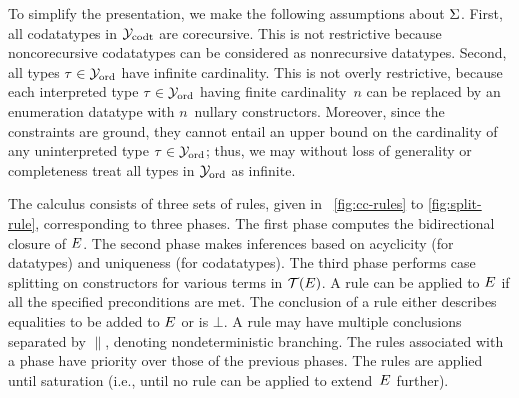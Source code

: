 To simplify the presentation, we make the following assumptions about $\mathrm{\Sigma}$.
First, all codatatypes in $\mathcal{Y}_{\mathrm{codt}}$ are corecursive. This is not restrictive
because noncorecursive codatatypes can be considered as nonrecursive
datatypes.
Second, all types $\tau \in \mathcal{Y}_{\mathrm{ord}}$ have infinite cardinality.
This is not overly restrictive, because each interpreted type $\tau \in \mathcal{Y}_{\mathrm{ord}}$
having finite cardinality~$n$
can be replaced by an enumeration datatype with $n$~nullary constructors.
Moreover, since the constraints are ground, they cannot entail an upper bound
on the cardinality of any uninterpreted type $\tau \in \mathcal{Y}_{\mathrm{ord}}$; thus,
we may without loss of generality or completeness treat all types in $\mathcal{Y}_{\mathrm{ord}}$ as infinite.

The calculus consists of three sets of rules, given in \figuresname~\ref{fig:cc-rules} to
\ref{fig:split-rule}, corresponding to three phases. The first
phase computes the bidirectional closure of $E$. The second phase makes
inferences based on acyclicity (for datatypes) and uniqueness (for
codatatypes). The third phase performs case splitting on constructors for
various terms in $\mathcal{T}(E)$.
A rule can be applied to $E$ if all the specified preconditions are met.
The conclusion of a rule either describes equalities to be added to $E$
or is $\bot$.
A rule may have multiple conclusions separated by $\parallel$,
denoting nondeterministic branching. The rules associated with a phase have
priority over those of the previous phases. The rules are applied until
saturation (i.e., until no rule can be applied to extend~$E$
further).


